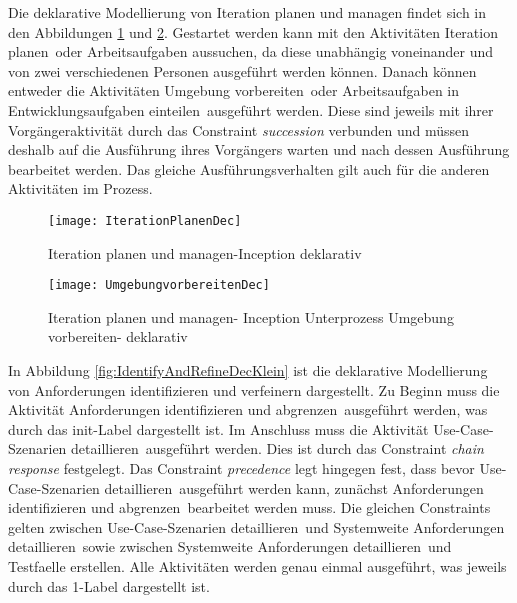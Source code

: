 Die deklarative Modellierung von Iteration planen und managen findet sich in den Abbildungen \ref{fig:IterationPlanenDec} und \ref{fig:UmgebungVorbereitenDec}. Gestartet werden kann mit den Aktivitäten \grqq Iteration planen\grqq \ oder \grqq Arbeitsaufgaben aussuchen\grqq, da diese unabhängig voneinander und von zwei verschiedenen Personen ausgeführt werden können.\newline
Danach können entweder die Aktivitäten \grqq Umgebung vorbereiten\grqq \ oder \grqq Arbeitsaufgaben in Entwicklungsaufgaben einteilen\grqq \ ausgeführt werden. Diese sind jeweils mit ihrer Vorgängeraktivität durch das Constraint \textit{succession} verbunden und müssen deshalb auf die Ausführung ihres Vorgängers warten und nach dessen Ausführung bearbeitet werden.\newline
Das gleiche Ausführungsverhalten gilt auch für die anderen Aktivitäten im Prozess. 



\begin{figure}[htp]
\begin{center}
  \texttt{[image: IterationPlanenDec]} %
  \caption{Iteration planen und managen-Inception deklarativ}
  \label{fig:IterationPlanenDec}
\end{center}
\end{figure}

\begin{figure}[htp]
\begin{center}
  \texttt{[image: UmgebungvorbereitenDec]} %
  \caption{Iteration planen und managen- Inception Unterprozess Umgebung vorbereiten- deklarativ}
  \label{fig:UmgebungVorbereitenDec}
\end{center}
\end{figure}


In Abbildung \ref{fig:IdentifyAndRefineDecKlein} ist die deklarative Modellierung von Anforderungen identifizieren und verfeinern dargestellt.\newline
Zu Beginn muss die Aktivität \grqq Anforderungen identifizieren und abgrenzen\grqq \ ausgeführt werden, was durch das init-Label dargestellt ist. Im Anschluss muss die Aktivität \grqq Use-Case-Szenarien detaillieren\grqq \ ausgeführt werden. Dies ist durch das Constraint \textit{chain response} festgelegt. Das Constraint \textit{precedence} legt hingegen fest, dass bevor \grqq Use-Case-Szenarien detaillieren\grqq \ ausgeführt werden kann, zunächst \grqq Anforderungen identifizieren und abgrenzen\grqq \ bearbeitet werden muss. Die gleichen Constraints gelten zwischen \grqq Use-Case-Szenarien detaillieren\grqq \ und \grqq Systemweite Anforderungen detaillieren\grqq \ sowie zwischen \grqq Systemweite Anforderungen detaillieren\grqq \ und \grqq Testfaelle erstellen\grqq. Alle Aktivitäten werden genau einmal ausgeführt, was jeweils durch das 1-Label dargestellt ist. 

